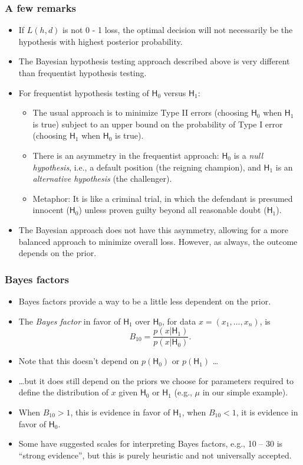 \documentclass[handout]{beamer}
\def\H{\textsf{H}}
\begin{document}
\begin{frame}
\frametitle{A few remarks}
\begin{itemize}
\item If $L(h,d)$ is not 0 - 1 loss, the optimal decision will not necessarily be the hypothesis with highest posterior probability.
\item The Bayesian hypothesis testing approach described above is very different than frequentist hypothesis testing.
\item For frequentist hypothesis testing of $\H_0$ versus $\H_1$:
\begin{itemize}
\item The usual approach is to minimize Type II errors (choosing $\H_0$ when $\H_1$ is true) subject to an upper bound on the probability of Type I error (choosing $\H_1$ when $\H_0$ is true).
\item There is an asymmetry in the frequentist approach: $\H_0$ is a \emph{null hypothesis}, i.e., a default position (the reigning champion), and $\H_1$ is an \emph{alternative hypothesis} (the challenger).
\item Metaphor: It is like a criminal trial, in which the defendant is presumed innocent ($\H_0$) unless proven guilty beyond all reasonable doubt ($\H_1$).
\end{itemize}
\item The Bayesian approach does not have this asymmetry, allowing for a more balanced approach to minimize overall loss.  However, as always, the outcome depends on the prior.
\end{itemize}
\end{frame}



\begin{frame}
\frametitle{Bayes factors}
\begin{itemize}
\item Bayes factors provide a way to be a little less dependent on the prior.
\item The \emph{Bayes factor} in favor of $\H_1$ over $\H_0$, for data $x =(x_1,\dotsc,x_n)$, is
$$ B_{10} = \frac{p(x|\H_1)}{p(x|\H_0)}. $$
\item Note that this doesn't depend on $p(\H_0)$ or $p(\H_1)$ \dots
\item \dots but it does still depend on the priors we choose for parameters required to define the distribution of $x$ given $\H_0$ or $\H_1$ (e.g., $\mu$ in our simple example).
\item When $B_{10}>1$, this is evidence in favor of $\H_1$, when $B_{10}<1$, it is evidence in favor of $\H_0$.
\item Some have suggested scales for interpreting Bayes factors, e.g., 10 -- 30 is ``strong evidence'', but this is purely heuristic and not universally accepted.
\end{itemize}
\end{frame}
\end{document}
